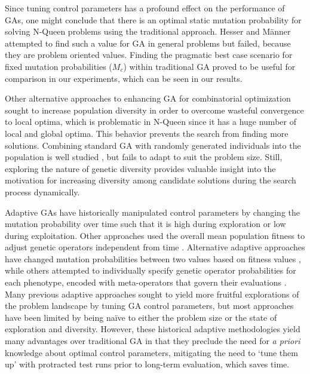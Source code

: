 \documentclass[conference]{IEEEtran}
\begin{document}
Since tuning control parameters has a profound effect on the performance of GAs, one might conclude that there is an optimal static mutation probability \cite{cit:4} for solving N-Queen problems using the traditional approach. Hesser and M\"{a}nner \cite{cit:14} attempted to find such a value for GA in general problems but failed, because they are problem oriented values. Finding the pragmatic best case scenario for fixed mutation probabilities ($M_{c}$) within traditional GA proved to be useful for comparison in our experiments, which can be seen in our results.

Other alternative approaches to enhancing GA for combinatorial optimization sought to increase population diversity in order to overcome wasteful convergence to local optima, which is problematic in N-Queen since it has a huge number of local and global optima. This behavior prevents the search from finding more solutions. Combining standard GA with randomly generated individuals into the population is well studied \cite{cit:12}, but fails to adapt to suit the problem size. Still, exploring the nature of genetic diversity provides valuable insight into the motivation for increasing diversity among candidate solutions during the search process dynamically.

Adaptive GAs have historically manipulated control parameters by changing the mutation probability over time \cite{cit:12} such that it is high during exploration or low during exploitation. Other approaches used the overall mean population fitness to adjust genetic operators independent from time \cite{cit:11,cit:15,cit:7}. Alternative adaptive approaches have changed mutation probabilities between two values based on fitness values \cite{cit:15}, while others attempted to individually specify genetic operator probabilities for each phenotype, encoded with meta-operators that govern their evaluations \cite{cit:5}. Many previous adaptive approaches sought to yield more fruitful explorations of the problem landscape by tuning GA control parameters, but most approaches have been limited by being na\"{i}ve to either the problem size or the state of exploration and diversity. However, these historical adaptive methodologies yield many advantages over traditional GA in that they preclude the need for \textit{a priori} knowledge about optimal control parameters, mitigating the need to `tune them up' with protracted test runs prior to long-term evaluation, which saves time.
\end{document}
